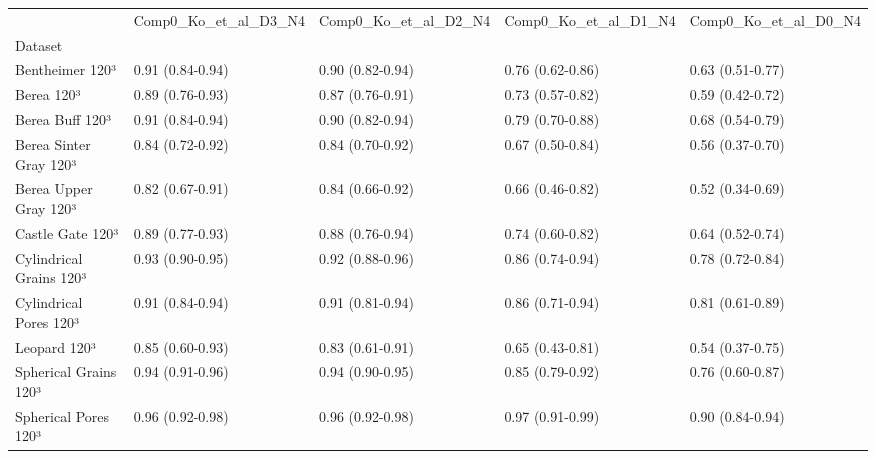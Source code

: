 \begin{tabular}{lllll}
\toprule
 & Comp0_Ko_et_al_D3_N4 & Comp0_Ko_et_al_D2_N4 & Comp0_Ko_et_al_D1_N4 & Comp0_Ko_et_al_D0_N4 \\
Dataset &  &  &  &  \\
\midrule
Bentheimer 120³ & 0.91 (0.84-0.94) & 0.90 (0.82-0.94) & 0.76 (0.62-0.86) & 0.63 (0.51-0.77) \\
Berea 120³ & 0.89 (0.76-0.93) & 0.87 (0.76-0.91) & 0.73 (0.57-0.82) & 0.59 (0.42-0.72) \\
Berea Buff 120³ & 0.91 (0.84-0.94) & 0.90 (0.82-0.94) & 0.79 (0.70-0.88) & 0.68 (0.54-0.79) \\
Berea Sinter Gray 120³ & 0.84 (0.72-0.92) & 0.84 (0.70-0.92) & 0.67 (0.50-0.84) & 0.56 (0.37-0.70) \\
Berea Upper Gray 120³ & 0.82 (0.67-0.91) & 0.84 (0.66-0.92) & 0.66 (0.46-0.82) & 0.52 (0.34-0.69) \\
Castle Gate 120³ & 0.89 (0.77-0.93) & 0.88 (0.76-0.94) & 0.74 (0.60-0.82) & 0.64 (0.52-0.74) \\
Cylindrical Grains 120³ & 0.93 (0.90-0.95) & 0.92 (0.88-0.96) & 0.86 (0.74-0.94) & 0.78 (0.72-0.84) \\
Cylindrical Pores 120³ & 0.91 (0.84-0.94) & 0.91 (0.81-0.94) & 0.86 (0.71-0.94) & 0.81 (0.61-0.89) \\
Leopard 120³ & 0.85 (0.60-0.93) & 0.83 (0.61-0.91) & 0.65 (0.43-0.81) & 0.54 (0.37-0.75) \\
Spherical Grains 120³ & 0.94 (0.91-0.96) & 0.94 (0.90-0.95) & 0.85 (0.79-0.92) & 0.76 (0.60-0.87) \\
Spherical Pores 120³ & 0.96 (0.92-0.98) & 0.96 (0.92-0.98) & 0.97 (0.91-0.99) & 0.90 (0.84-0.94) \\
\bottomrule
\end{tabular}
